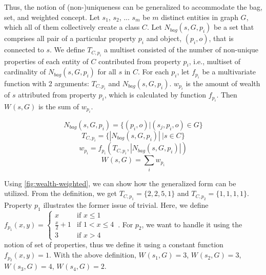 

Thus, the notion of (non-)uniqueness can be generalized to accommodate the bag, set, and weighted concept. Let \(s_1\), \(s_2\), ... \(s_m\) be \(m\) distinct entities in graph \(G\), which all of them collectively create a class \(C\). Let \(N_{bag}(s,G,p_i)\) be a set that comprises all pair of a particular property \(p_i\) and object, \((p_i,o)\), that is connected to \(s\). We define \(T_{C,p_i}\) a multiset consisted of the number of non-unique properties of each entity of \(C\) contributed from property \(p_i\), i.e., multiset of cardinality of \(N_{bag}(s,G,p_i)\) for all \(s\) in \(C\). For each \(p_i\), let \(f_{p_i}\) be a multivariate function with 2 arguments: \(T_{C,p_i}\) and \(N_{bag}(s,G,p_i)\). \(w_{p_i}\) is the amount of wealth of \(s\) attributed from property \(p_i\), which is calculated by function \(f_{p_i}\). Then \(W_{}(s, G)\) is the sum of \(w_{p_i}\).


\[
    N_{bag}(s,G,p_i) = \{(p_i,o) | (s_j, p_i, o) \in G\}
\]
\[
    T_{C,p_i} = \{|N_{bag}(s,G,p_i)|\ | s \in C\}
\]
\[
    w_{p_i} = f_{p_i}(T_{C,p_i}, |N_{bag}(s,G,p_i)|)
\]
\[
    W_{}(s, G) = \sum_i w_{p_i}
\]

Using \autoref{fig:wealth-weighted}, we can show how the generalized form can be utilized. From the definition, we get \(T_{C,p_1} = \{2, 2, 5, 1\}\) and \(T_{C,p_2} = \{1, 1, 1, 1\}\). Property \(p_1\) illustrates the former issue of trivial. Here, we define $f_{p_1}(x,y) = \begin{cases}
      x & \text{if }x \leq 1 \\
      \frac{x}{2} + 1 & \text{if }1 < x \leq 4 \\
      3 & \text{if }x > 4
    \end{cases}\, $.
For \(p_2\), we want to handle it using the notion of set of properties, thus we define it using a constant function \(f_{p_2}(x,y) = 1\).
With the above definition, \(W_{}(s_1, G) = 3\), \(W_{}(s_2, G) = 3\), \(W_{}(s_3, G) = 4\), \(W_{}(s_4, G) = 2\).

